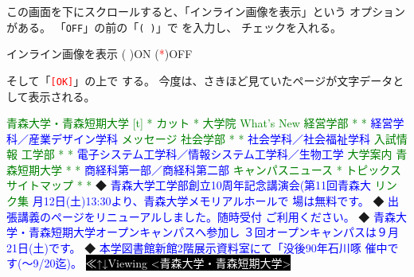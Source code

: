 この画面を下にスクロールすると、「インライン画像を表示」という
オプションがある。
「\texttt{OFF}」の前の「\texttt{( )}」で  を入力し、
チェックを入れる。

\begin{progls}
インライン画像を表示                    ( )ON  (\textcolor{red}{*})OFF
\end{progls}

そして「\textcolor{red}{\texttt{[OK]}}」の上で  する。
今度は、さきほど見ていたページが文字データとして表示される。

\begin{progls}
\textcolor{green}{青森大学・青森短期大学}
\textcolor{green}{[t]}                        \textcolor{green}{* カット}
    \textcolor{green}{*}                        \textcolor{green}{大学院}
    \textcolor{green}{What's New}               \textcolor{green}{経営学部}
    \textcolor{green}{*}                        \textcolor{green}{*} \textcolor{blue}{経営学科／産業デザイン学科}
    \textcolor{green}{メッセージ}               \textcolor{green}{社会学部}
    \textcolor{green}{*}                        \textcolor{green}{*} \textcolor{blue}{社会学科／社会福祉学科}
    \textcolor{green}{入試情報}                 \textcolor{green}{工学部}
    \textcolor{green}{*}                        \textcolor{green}{*} \textcolor{blue}{電子システム工学科／情報システム工学科／生物工学}
    \textcolor{green}{大学案内}                 \textcolor{green}{青森短期大学}
    \textcolor{green}{*}                        \textcolor{green}{*} \textcolor{blue}{商経科第一部／商経科第二部}
    \textcolor{green}{キャンパスニュース}
    \textcolor{green}{*}                        \textcolor{green}{トピックス}
    \textcolor{green}{サイトマップ}             \textcolor{green}{*}
    \textcolor{green}{*}                        ◆ \textcolor{blue}{青森大学工学部創立10周年記念講演会(第11回青森大}
    \textcolor{green}{リンク集}                    \textcolor{blue}{月12日(土)13:30より、青森大学メモリアルホールで}
                                \textcolor{blue}{場は無料です。}
                             ◆ \textcolor{blue}{出張講義のページをリニューアルしました。随時受付}
                                \textcolor{blue}{ご利用ください。}
                             ◆ \textcolor{blue}{青森大学・青森短期大学オープンキャンパスへ参加し}
                                \textcolor{blue}{３回オープンキャンパスは９月21日(土)です。}
                             ◆ \textcolor{blue}{本学図書館新館2階展示資料室にて「没後90年石川啄}
                                \textcolor{blue}{催中です(〜9/20迄)。}
\colorbox{black}{\textcolor{white}{≪↑↓Viewing <青森大学・青森短期大学>}}
\end{progls}

